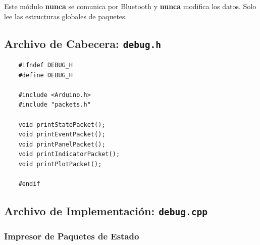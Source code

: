 \documentclass[12pt,a4paper]{article}
\newcommand{\ardfnDG}[1]{\texttt{\textcolor{arduinoTeal}{#1}}}
\begin{document}
Este módulo \textbf{nunca} se comunica por Bluetooth y \textbf{nunca} modifica
los datos. Solo lee las estructuras globales de paquetes.

\subsection{Archivo de Cabecera: \ardfnDG{debug.h}}

\begin{lstlisting}
	#ifndef DEBUG_H
	#define DEBUG_H
	
	#include <Arduino.h>
	#include "packets.h"
	
	void printStatePacket();
	void printEventPacket();
	void printPanelPacket();
	void printIndicatorPacket();
	void printPlotPacket();
	
	#endif
\end{lstlisting}

\subsection{Archivo de Implementación: \ardfnDG{debug.cpp}}

\subsubsection{Impresor de Paquetes de Estado}
\end{document}
